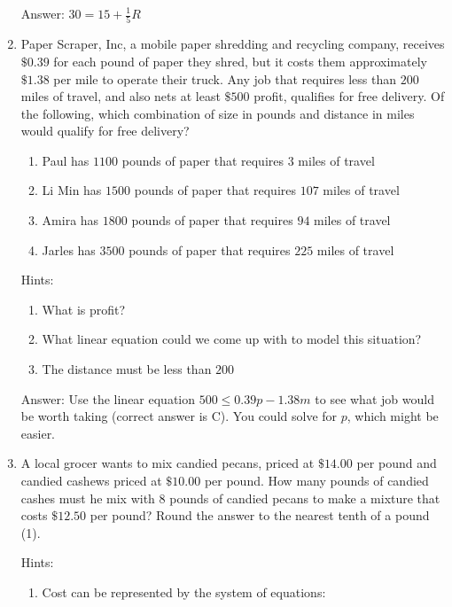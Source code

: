 \documentclass{article}
\begin{document}
\begin{enumerate}
{	      Answer: \(30=15+\frac{1}{5}R\)
	      }

	\item{Paper Scraper, Inc, a mobile paper shredding and recycling company, receives $\$0.39$ for each pound of paper they shred, but it costs them approximately $\$1.38$ per mile to operate their truck. Any job that requires less than $200$ miles of travel, and also nets at least $\$500$ profit, qualifies for free delivery. Of the following, which combination of size in pounds and distance in miles would qualify for free delivery?

		      \begin{enumerate}
			      \item {Paul has $1100$ pounds of paper that requires $3$ miles of travel}
			      \item {Li Min has $1500$ pounds of paper that requires $107$ miles of travel}
			      \item {Amira has $1800$ pounds of paper that requires $94$ miles of travel}
			      \item {Jarles has $3500$ pounds of paper that requires $225$ miles of travel}
		      \end{enumerate}

		      Hints:
		      \begin{enumerate}
			      \item{What is profit?}
			      \item{What linear equation could we come up with to model this situation?}
			      \item{The distance must be less than $200$}
		      \end{enumerate}

		      Answer: Use the linear equation \(500\leq 0.39p - 1.38m\) to see what job would be worth taking (correct answer is C). You could solve for $p$, which might be easier.
	      }

	\item {A local grocer wants to mix candied pecans, priced at $\$14.00$ per pound and candied cashews priced at $\$10.00$ per pound. How many pounds of candied cashes must he mix with $8$ pounds of candied pecans to make a mixture that costs $\$12.50$ per pound? Round the answer to the nearest tenth of a pound (1).

		      Hints:
		      \begin{enumerate}
			      \item{Cost can be represented by the system of equations:

}
\end{enumerate}}
\end{enumerate}
\end{document}
